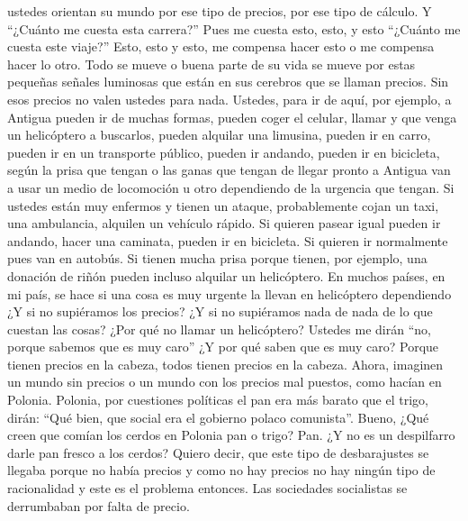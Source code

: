 ustedes orientan su mundo por ese tipo de precios, por ese tipo de cálculo. Y \enquote{¿Cuánto me cuesta esta carrera?} Pues me cuesta esto, esto, y esto \enquote{¿Cuánto me cuesta este viaje?} Esto, esto y esto, me compensa hacer esto o me compensa hacer lo otro. Todo se mueve o buena parte de su vida se mueve por estas pequeñas señales luminosas que están en sus cerebros que se llaman precios. Sin esos precios no valen ustedes para nada. Ustedes, para ir de aquí, por ejemplo, a Antigua pueden ir de muchas formas, pueden coger el celular, llamar y que venga un helicóptero a buscarlos, pueden alquilar una limusina, pueden ir en carro, pueden ir en un transporte público, pueden ir andando, pueden ir en bicicleta, según la prisa que tengan o las ganas que tengan de llegar pronto a Antigua van a usar un medio de locomoción u otro dependiendo de la urgencia que tengan. Si ustedes están muy enfermos y tienen un ataque, probablemente cojan un taxi, una ambulancia, alquilen un vehículo rápido. Si quieren pasear igual pueden ir andando, hacer una caminata, pueden ir en bicicleta. Si quieren ir normalmente pues van en autobús. Si tienen mucha prisa porque tienen, por ejemplo, una donación de riñón pueden incluso alquilar un helicóptero. En muchos países, en mi país, se hace si una cosa es muy urgente la llevan en helicóptero dependiendo ¿Y si no supiéramos los precios? ¿Y si no supiéramos nada de nada de lo que cuestan las cosas? ¿Por qué no llamar un helicóptero? Ustedes me dirán \enquote{no, porque sabemos que es muy caro} ¿Y por qué saben que es muy caro? Porque tienen precios en la cabeza, todos tienen precios en la cabeza. Ahora, imaginen un mundo sin precios o un mundo con los precios mal puestos, como hacían en Polonia. Polonia, por cuestiones políticas el pan era más barato que el trigo, dirán: \enquote{Qué bien, que social era el gobierno polaco comunista}. Bueno, ¿Qué creen que comían los cerdos en Polonia pan o trigo? Pan. ¿Y no es un despilfarro darle pan fresco a los cerdos? Quiero decir, que este tipo de desbarajustes se llegaba porque no había precios y como no hay precios no hay ningún tipo de racionalidad y este es el problema entonces. Las sociedades socialistas se derrumbaban por falta de precio.

